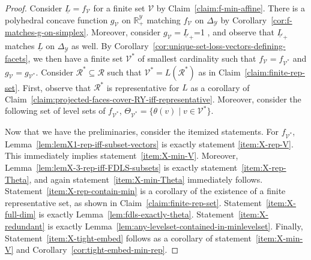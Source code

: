\documentclass[11pt]{article}
\newcommand{\Comments}{1}
\newcommand{\mytodo}[2]{\ifnum\Comments=1%
  \todo[linecolor=#1!80!black,backgroundcolor=#1,bordercolor=#1!80!black]{#2}\fi}
\newcommand{\jessiet}[1]{\mytodo{teal!20!white}{JF: #1}}
\newcommand{\reals}{\mathbb{R}}
\newcommand{\simplex}{\Delta_\Y}
\newcommand{\R}{\mathcal{R}}
\newcommand{\V}{\mathcal{V}}
\newcommand{\Y}{\mathcal{Y}}
\newcommand{\risk}[1]{\underline{#1}}
\begin{document}
\lemmaX*
\begin{proof}
Consider $\risk L = f_\V$ for a finite set $\V$ by Claim~\ref{claim:f-min-affine}.
There is a polyhedral concave function $g_\V$ on $\reals^\Y_+$ matching $f_\V$ on $\simplex$ by Corollary~\ref{cor:f-matches-g-on-simplex}.
Moreover, consider $g_\V = \risk L_+$\jessiet{is it clear enough that $g_\V = \risk L_+$?}, and observe that $\risk L_+$ matches $\risk L$ on $\simplex$ as well.
By Corollary~\ref{cor:unique-set-loss-vectors-defining-facets}, we then have a finite set $\V^*$ of smallest cardinality such that $f_\V = f_{\V^*}$ and $g_\V = g_{\V^*}$.
Consider $\R^* \subseteq \R$ such that $\V^* = L(\R^*)$ as in Claim~\ref{claim:finite-rep-set}.
First, observe that $\R^*$ is representative for $L$ as a corollary of Claim~\ref{claim:projected-faces-cover-RY-iff-representative}.
Moreover, consider the following set of level sets of $f_{\V^*}$, $\Theta_{\V^*} = \{\theta(v) \mid v \in \V^*\}$.

Now that we have the preliminaries, consider the itemized statements.
For $f_{\V^*}$, Lemma~\ref{lem:lemX1-rep-iff-subset-vectors} is exactly statement \eqref{item:X-rep-V}.
This immediately implies statement~\eqref{item:X-min-V}.
Moreover, Lemma~\ref{lem:lemX-3-rep-iff-FDLS-subsets} is exactly statement~\eqref{item:X-rep-Theta}, and again statement~\eqref{item:X-min-Theta} immediately follows.
Statement~\eqref{item:X-rep-contain-min} is a corollary of the existence of a finite representative set, as shown in Claim~\ref{claim:finite-rep-set}.
Statement~\eqref{item:X-full-dim} is exactly Lemma~\ref{lem:fdls-exactly-theta}.
Statement~\eqref{item:X-redundant} is exactly Lemma~\ref{lem:any-levelset-contained-in-minlevelset}.
Finally, Statement~\eqref{item:X-tight-embed} follows as a corollary of statement~\eqref{item:X-min-V} and Corollary~\ref{cor:tight-embed-min-rep}.
\end{proof}
\end{document}
